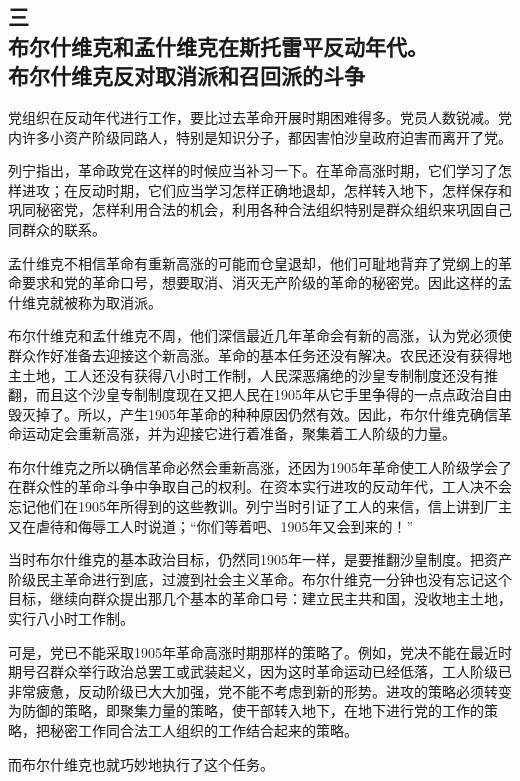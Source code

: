 \subsection[三\q 布尔什维克和孟什维克在斯托雷平反动年代。布尔什维克反对取消派和召回派的斗争]{三\\布尔什维克和孟什维克在斯托雷平反动年代。\\布尔什维克反对取消派和召回派的斗争}

党组织在反动年代进行工作，要比过去革命开展时期困难得多。党员人数锐减。党内许多小资产阶级同路人，特别是知识分子，都因害怕沙皇政府迫害而离开了党。

列宁指出，革命政党在这样的时候应当补习一下。在革命高涨时期，它们学习了怎样进攻；在反动时期，它们应当学习怎样正确地退却，怎样转入地下，怎样保存和巩同秘密党，怎样利用合法的机会，利用各种合法组织特别是群众组织来巩固自己同群众的联系。

孟什维克不相信革命有重新高涨的可能而仓皇退却，他们可耻地背弃了党纲上的革命要求和党的革命口号，想要取消、消灭无产阶级的革命的秘密党。因此这样的孟什维克就被称为取消派。

布尔什维克和孟什维克不周，他们深信最近几年革命会有新的高涨，认为党必须使群众作好准备去迎接这个新高涨。革命的基本任务还没有解决。农民还没有获得地主土地，工人还没有获得八小时工作制，人民深恶痛绝的沙皇专制制度还没有推翻，而且这个沙皇专制制度现在又把人民在1905年从它手里争得的一点点政治自由毁灭掉了。所以，产生1905年革命的种种原因仍然有效。因此，布尔什维克确信革命运动定会重新高涨，并为迎接它进行着准备，聚集着工人阶级的力量。

布尔什维克之所以确信革命必然会重新高涨，还因为1905年革命使工人阶级学会了在群众性的革命斗争中争取自己的权利。在资本实行进攻的反动年代，工人决不会忘记他们在1905年所得到的这些教训。列宁当时引证了工人的来信，信上讲到厂主又在虐待和侮辱工人时说道；“你们等着吧、1905年又会到来的！”

当时布尔什维克的基本政治目标，仍然同1905年一样，是要推翻沙皇制度。把资产阶级民主革命进行到底，过渡到社会主义革命。布尔什维克一分钟也没有忘记这个目标，继续向群众提出那几个基本的革命口号：建立民主共和国，没收地主土地，实行八小时工作制。

可是，党已不能采取1905年革命高涨时期那样的策略了。例如，党决不能在最近时期号召群众举行政治总罢工或武装起义，因为这时革命运动已经低落，工人阶级已非常疲惫，反动阶级已大大加强，党不能不考虑到新的形势。进攻的策略必须转变为防御的策略，即聚集力量的策略，使干部转入地下，在地下进行党的工作的策略，把秘密工作同合法工人组织的工作结合起来的策略。

而布尔什维克也就巧妙地执行了这个任务。

